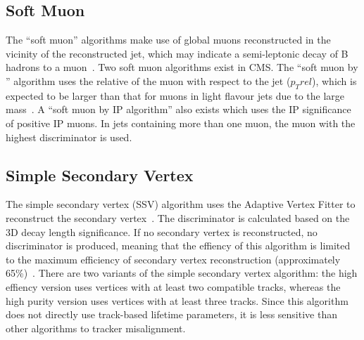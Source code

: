 \subsection*{Soft Muon}
\label{ss:soft_muon}
The ``soft muon'' algorithms make use of global muons reconstructed in the vicinity of the reconstructed jet,
which may indicate a semi-leptonic decay of B hadrons to a muon~\cite{CMS-AN-2009-085}. Two soft muon
algorithms exist in CMS. The ``soft muon by \pt'' algorithm uses the relative \pt of the muon with respect to
the jet ($p_{T}{rel}$), which is expected to be larger than that for muons in light flavour jets due to the
large \bquark mass~\cite{CMS-AN-2009-085, Ferro:2012tg}. A ``soft muon by IP algorithm'' also exists which
uses the IP significance of positive IP muons. In jets containing more than one muon, the muon with the
highest discriminator is used.

\subsection*{Simple Secondary Vertex}
\label{ss:simple_secondary_vertex}
The simple secondary vertex (SSV) algorithm uses the Adaptive Vertex Fitter to reconstruct the secondary
vertex~\cite{0954-3899-34-12-N01}. The discriminator is calculated based on the 3D decay length significance.
If no secondary vertex is reconstructed, no discriminator is produced, meaning that the effiency of this
algorithm is limited to the maximum efficiency of secondary vertex reconstruction (approximately
65\%)~\cite{Chatrchyan:2012jua}. There are two variants of the simple secondary vertex algorithm: the high
effiency version uses vertices with at least two compatible tracks, whereas the high purity version uses
vertices with at least three tracks. Since this algorithm does not directly use track-based lifetime
parameters, it is less sensitive than other algorithms to tracker misalignment.

